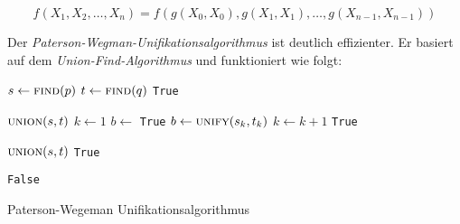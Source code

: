 \[f(X_1, X_2, \dots, X_n) = f(g(X_0, X_0), g(X_1, X_1), \dots, g(X_{n-1}, X_{n-1}) )\]

Der \textit{Paterson-Wegman-Unifikationsalgorithmus} ist deutlich effizienter.
Er basiert auf dem \textit{Union-Find-Algorithmus}
und funktioniert wie folgt:

\begin{algorithm}[h]
    \begin{algorithmic}
            \State $s \gets \Call{find}{p}$
            \State $t \gets \Call{find}{q}$
                \State \Return \texttt{True}
            \EndIf

                \State $\Call{union}{s,t}$
                \State $k \gets 1$
                \State $b \gets $ \texttt{True}
                    \State $b \gets \Call{unify}{s_k, t_k}$
                    \State $k \gets k + 1$
                \EndWhile
                \State \Return \texttt{True}
            \EndIf

                \State $\Call{union}{s,t}$
                \State \Return \texttt{True}
            \EndIf

            \State \Return \texttt{False}
        \EndFunction
    \end{algorithmic}
\caption{Paterson-Wegeman Unifikationsalgorithmus}
\label{alg:paterson-wegeman-unifikationsalgorithmus}
\end{algorithm}


